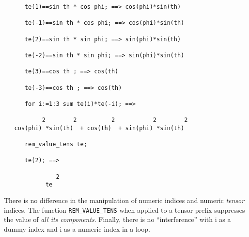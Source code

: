 \begin{verbatim}
      te(1)==sin th * cos phi; ==> cos(phi)*sin(th)

      te(-1)==sin th * cos phi; ==> cos(phi)*sin(th)

      te(2)==sin th * sin phi; ==> sin(phi)*sin(th)

      te(-2)==sin th * sin phi; ==> sin(phi)*sin(th)

      te(3)==cos th ; ==> cos(th)

      te(-3)==cos th ; ==> cos(th)

      for i:=1:3 sum te(i)*te(-i); ==>

           2        2          2           2        2
   cos(phi) *sin(th)  + cos(th)  + sin(phi) *sin(th)

      rem_value_tens te;

      te(2); ==>

               2
            te
\end{verbatim}
There is no difference in the manipulation of numeric indices and numeric
\emph{tensor} indices. The function \texttt{REM\_VALUE\_TENS}
when applied to a tensor prefix suppresses the value of
\emph{all its components}. Finally, there is no ``interference'' with
i as a dummy index and i as a numeric index in a loop.

